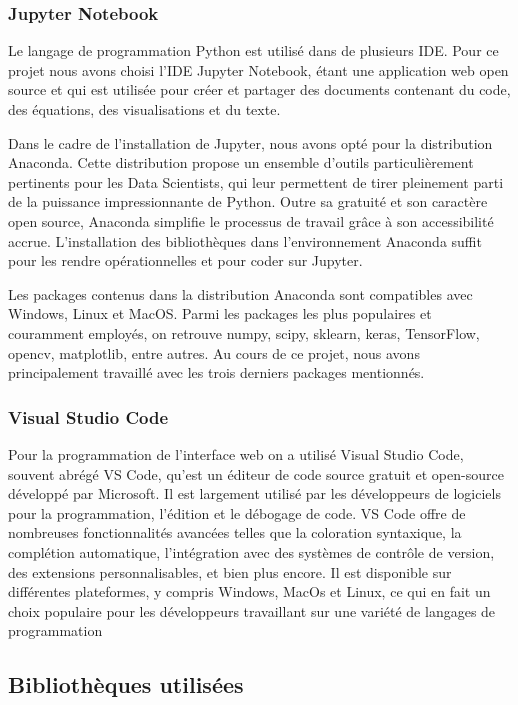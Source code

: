 \subsubsection{Jupyter Notebook}
Le langage de programmation Python est utilisé dans de plusieurs IDE. Pour ce projet nous avons choisi l'IDE Jupyter Notebook,  étant une application web open source et qui est utilisée pour créer et partager des documents contenant du code, des équations, des visualisations et du texte. \par
Dans le cadre de l'installation de Jupyter, nous avons opté pour la distribution Anaconda. Cette distribution propose un ensemble d'outils particulièrement pertinents pour les Data Scientists, qui leur permettent de tirer pleinement parti de la puissance impressionnante de Python. Outre sa gratuité et son caractère open source, Anaconda simplifie le processus de travail grâce à son accessibilité accrue. L'installation des bibliothèques dans l'environnement Anaconda suffit pour les rendre opérationnelles et pour coder sur Jupyter. \par
Les packages contenus dans la distribution Anaconda sont compatibles avec Windows, Linux et MacOS. Parmi les packages les plus populaires et couramment employés, on retrouve numpy, scipy, sklearn, keras, TensorFlow, opencv, matplotlib, entre autres. Au cours de ce projet, nous avons principalement travaillé avec les trois derniers packages mentionnés.
\subsubsection{Visual Studio Code }
Pour la programmation de l’interface web on a utilisé Visual Studio Code, souvent abrégé VS Code, qu’est un éditeur de code source gratuit et open-source développé par Microsoft. Il est largement utilisé par les développeurs de logiciels pour la programmation, l'édition et le débogage de code. VS Code offre de nombreuses fonctionnalités avancées telles que la coloration syntaxique, la complétion automatique, l'intégration avec des systèmes de contrôle de version, des extensions personnalisables, et bien plus encore. Il est disponible sur différentes plateformes, y compris Windows, MacOs et Linux, ce qui en fait un choix populaire pour les développeurs travaillant sur une variété de langages de programmation


\subsection{Bibliothèques utilisées}


